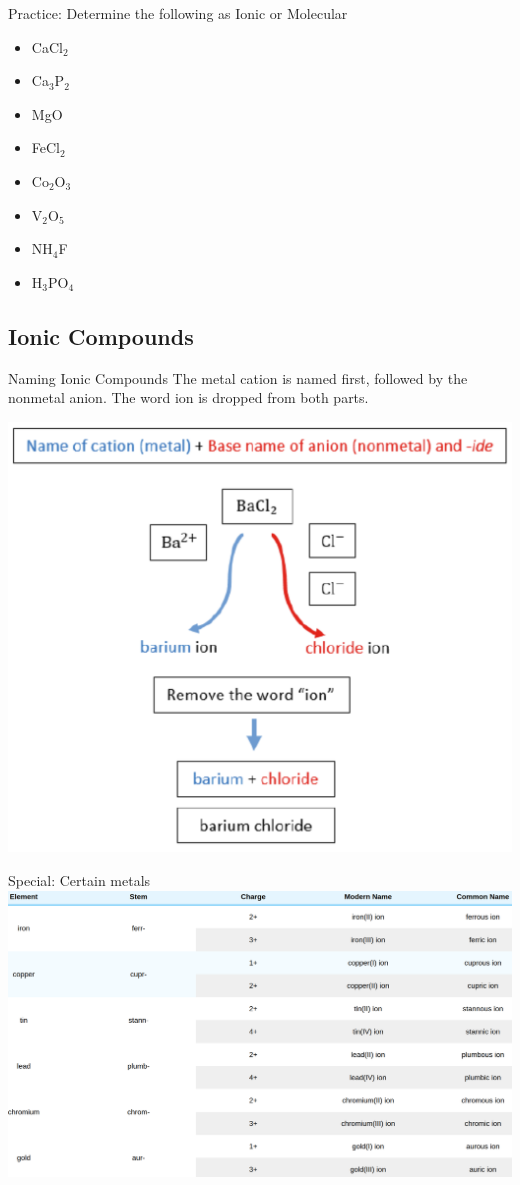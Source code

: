 \documentclass[11pt]{beamer}
\begin{document}
\begin{frame}{Practice: Determine the following as Ionic or Molecular}
  \begin{itemize}
  \item CaCl$_2$
  \item Ca$_3$P$_2$
  \item MgO
  \item FeCl$_2$
  \item Co$_2$O$_3$
  \item V$_2$O$_5$
  \item NH$_4$F
  \item H$_3$PO$_4$
  \end{itemize}
\end{frame}

\subsection{Ionic Compounds}

\begin{frame}{Naming Ionic Compounds}
  The metal cation is named first, followed by the nonmetal anion.
  The word ion is dropped from both parts.

  \centering
  \includegraphics[width=0.7\linewidth]{barium_examp.png}
\end{frame}

\begin{frame}{Special: Certain metals}
  \centering
  \includegraphics[width=\linewidth]{ions_names}
\end{frame}
\end{document}
